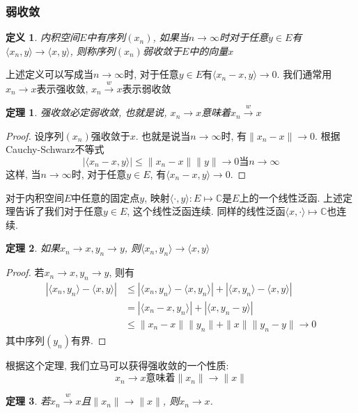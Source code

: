 \documentclass[a4paper,11pt]{book}
\newtheorem{definition}{\hspace{2em}定义}[section]
\newtheorem{theorem}{\hspace{2em}定理}[section]
\newtheorem{proof}{证明}[section]
\begin{document}
\subsubsection*{弱收敛}
\begin{definition}
  内积空间$E$中有序列$(x_n)$, 如果当$n\to \infty$时对于任意$y\in E$有$\langle x_n,y\rangle\to\langle x,y\rangle$, 则称序列$(x_n)$弱收敛于$E$中的向量$x$
\end{definition}
上述定义可以写成当$n\to\infty$时, 对于任意$y\in E$有$\langle x_n-x,y\rangle\to 0$. 我们通常用$x_n\to x$表示强收敛, $x_n\stackrel{w}{\to} x$表示弱收敛
\begin{theorem}
  强收敛必定弱收敛, 也就是说, $x_n\to x$意味着$x_n\stackrel{w}{\to}x$
\end{theorem}
\begin{proof}
  设序列$(x_n)$强收敛于$x$. 也就是说当$n\to \infty$时, 有$\|x_n-x\|\to 0$. 根据Cauchy-Schwarz不等式
  \begin{equation*}
    |\langle x_n-x,y\rangle|\leq\|x_n-x\|\|y\|\to 0\text{当$n\to\infty$}
  \end{equation*}
  这样, 当$n\to \infty$时, 对于任意$y\in E$, 有$\langle x_n-x,y\rangle\to 0$.
\end{proof}
对于内积空间$E$中任意的固定点$y$, 映射$\langle\cdot,y\rangle:E\mapsto\mathbb{C}$是$E$上的一个线性泛函. 上述定理告诉了我们对于任意$y\in E$, 这个线性泛函连续. 同样的线性泛函$\langle x,\cdot\rangle\mapsto\mathbb{C}$也连续.
\begin{theorem}
  如果$x_n\to x,y_n\to y$, 则$\langle x_n,y_n\rangle\to\langle x,y\rangle$
\end{theorem}
\begin{proof}
  若$x_n\to x,y_n\to y$, 则有
  \begin{equation*}
  \begin{split}
     |\langle x_n,y_n\rangle-\langle x,y\rangle|& \leq|\langle x_n,y_n\rangle-\langle x,y_n\rangle|+|\langle x,y_n\rangle-\langle x,y\rangle| \\
       & =|\langle x_n-x,y_n\rangle|+|\langle x,y_n-y\rangle| \\
       & \leq\|x_n-x\|\|y_n\|+\|x\|\|y_n-y\|\to 0
  \end{split}
  \end{equation*}
  其中序列$(y_n)$有界.
\end{proof}
根据这个定理, 我们立马可以获得强收敛的一个性质:
\begin{equation*}
  x_n\to x\text{意味着$\|x_n\|\to\|x\|$}
\end{equation*}
\begin{theorem}
  若$x_n\stackrel{w}{\to}x$且$\|x_n\|\to\|x\|$, 则$x_n\to x$.
\end{theorem}
\end{document}
